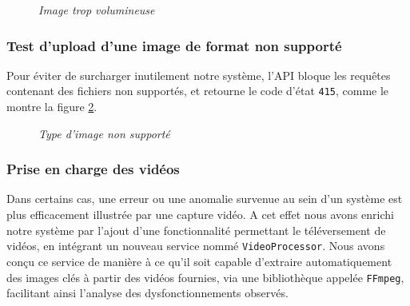\documentclass[12pt,a4paper]{report}
\begin{document}
	\begin{figure}[H]
		\centering
		\caption{\textit{Image trop volumineuse}}
		\label{fig:image-tros-grande}
	\end{figure}
	
	\subsubsection{Test d'upload d'une image de format non supporté}
	
	Pour éviter de surcharger inutilement notre système, l'API bloque les requêtes contenant des fichiers non supportés, et retourne le code d'état \verb|415|, comme le montre la figure \ref{fig:format-non-supporté}.
	
	\begin{figure}[H]
		\centering
		\caption{\textit{Type d'image non supporté}}
		\label{fig:format-non-supporté}
	\end{figure}
	
	\subsubsection{Prise en charge des vidéos}
	
	Dans certains cas, une erreur ou une anomalie survenue au sein d’un système est plus efficacement illustrée par une capture vidéo. A cet effet nous avons enrichi notre système par l’ajout d’une fonctionnalité permettant le téléversement de vidéos, en intégrant un nouveau service nommé \verb|VideoProcessor|. Nous avons conçu ce service de manière à ce qu'il soit capable d'extraire automatiquement des images clés à partir des vidéos fournies, via une bibliothèque appelée \verb|FFmpeg|, facilitant ainsi l’analyse des dysfonctionnements observés.
	
\end{document}
